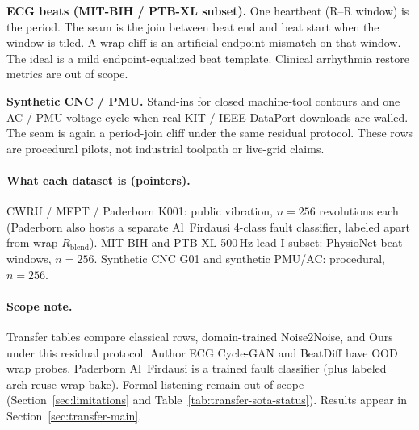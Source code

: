 \textbf{ECG beats (MIT-BIH / PTB-XL subset).}
One heartbeat (R--R window) is the period.
The seam is the join between beat end and beat start when the window is tiled.
A wrap cliff is an artificial endpoint mismatch on that window.
The ideal is a mild endpoint-equalized beat template.
Clinical arrhythmia restore metrics are out of scope.

\textbf{Synthetic CNC / PMU.}
Stand-ins for closed machine-tool contours and one AC / PMU voltage cycle when real KIT / IEEE DataPort downloads are walled.
The seam is again a period-join cliff under the same residual protocol.
These rows are procedural pilots, not industrial toolpath or live-grid claims.

\paragraph{What each dataset is (pointers).}
CWRU / MFPT / Paderborn K001: public vibration, $n{=}256$ revolutions each (Paderborn also hosts a separate Al~Firdausi 4-class fault classifier, labeled apart from wrap-$R_{\mathrm{blend}}$).
MIT-BIH and PTB-XL 500\,Hz lead-I subset: PhysioNet beat windows, $n{=}256$.
Synthetic CNC G01 and synthetic PMU/AC: procedural, $n{=}256$.

\paragraph{Scope note.}
Transfer tables compare classical rows, domain-trained Noise2Noise, and Ours under this residual protocol.
Author ECG Cycle-GAN and BeatDiff have OOD wrap probes. Paderborn Al~Firdausi is a trained fault classifier
(plus labeled arch-reuse wrap bake). Formal listening remain out of scope
(Section~\ref{sec:limitations} and Table~\ref{tab:transfer-sota-status}).
Results appear in Section~\ref{sec:transfer-main}.
